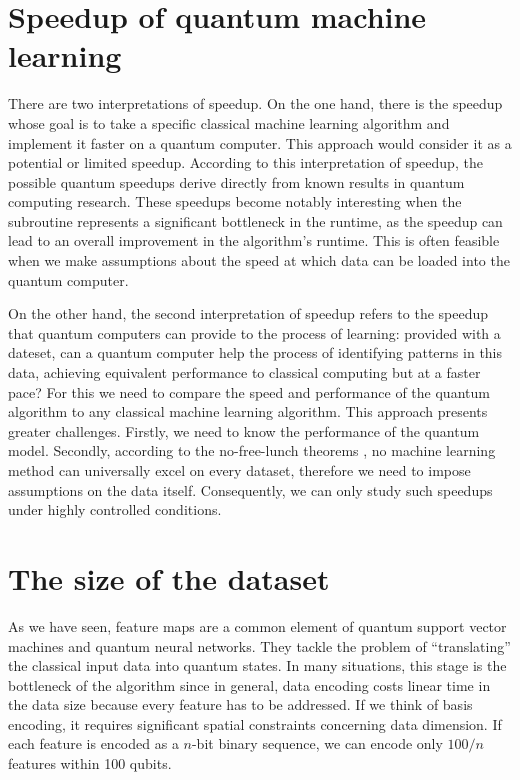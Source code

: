 \section{Speedup of quantum machine learning}

There are two interpretations of speedup. On the one hand, there is the speedup whose goal is to take a specific classical machine learning algorithm and implement it faster on a quantum computer. This approach would consider it as a potential or limited speedup. According to this interpretation of speedup, the possible quantum speedups derive directly from known results in quantum computing research. These speedups become notably interesting when the subroutine represents a significant bottleneck in the runtime, as the speedup can lead to an overall improvement in the algorithm's runtime. This is often feasible when we make assumptions about the speed at which data can be loaded into the quantum computer.

On the other hand, the second interpretation of speedup refers to the speedup that quantum computers can provide to the process of learning: provided with a dateset, can a quantum computer help the process of identifying patterns in this data, achieving equivalent performance to classical computing but at a faster pace? For this we need to compare the speed and performance of the quantum algorithm to any classical machine learning algorithm. This approach presents greater challenges. Firstly, we need to know the performance of the quantum model. Secondly, according to the no-free-lunch theorems \cite{noFreeLunch}, no machine learning method can universally excel on every dataset, therefore we need to impose assumptions on the data itself. Consequently, we can only study such speedups under highly controlled conditions.  


\section{The size of the dataset}

As we have seen, feature maps are a common element of quantum support vector machines and quantum neural networks. They tackle the problem of ``translating'' the classical input data into quantum states. In many situations, this stage is the bottleneck of the algorithm since in general, data encoding costs linear time in the data size because every feature has to be addressed. If we think of basis encoding, it requires significant spatial constraints concerning data dimension. If each feature is encoded as a $n$-bit binary sequence, we can encode only $100/n$ features within 100 qubits. 

